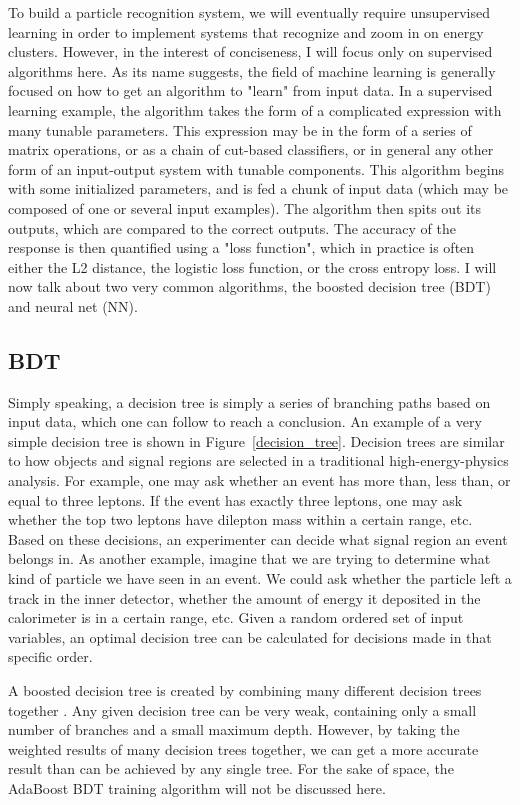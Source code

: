 To build a particle recognition system, we will eventually require unsupervised learning in order to implement systems that recognize and zoom in on energy clusters. However, in the interest of conciseness, I will focus only on supervised algorithms here. As its name suggests, the field of machine learning is generally focused on how to get an algorithm to "learn" from input data. In a supervised learning example, the algorithm takes the form of a complicated expression with many tunable parameters. This expression may be in the form of a series of matrix operations, or as a chain of cut-based classifiers, or in general any other form of an input-output system with tunable components. This algorithm begins with some initialized parameters, and is fed a chunk of input data (which may be composed of one or several input examples). The algorithm then spits out its outputs, which are compared to the correct outputs. The accuracy of the response is then quantified using a "loss function", which in practice is often either the L2 distance, the logistic loss function, or the cross entropy loss. I will now talk about two very common algorithms, the boosted decision tree (BDT) and neural net (NN).

\subsection*{BDT}

Simply speaking, a decision tree is simply a series of branching paths based on input data, which one can follow to reach a conclusion. An example of a very simple decision tree is shown in Figure~\ref{decision_tree}. Decision trees are similar to how objects and signal regions are selected in a traditional high-energy-physics analysis. For example, one may ask whether an event has more than, less than, or equal to three leptons. If the event has exactly three leptons, one may ask whether the top two leptons have dilepton mass within a certain range, etc. Based on these decisions, an experimenter can decide what signal region an event belongs in. As another example, imagine that we are trying to determine what kind of particle we have seen in an event. We could ask whether the particle left a track in the inner detector, whether the amount of energy it deposited in the calorimeter is in a certain range, etc. Given a random ordered set of input variables, an optimal decision tree can be calculated for decisions made in that specific order.

A boosted decision tree is created by combining many different decision trees together \cite{BDT}. Any given decision tree can be very weak, containing only a small number of branches and a small maximum depth. However, by taking the weighted results of many decision trees together, we can get a more accurate result than can be achieved by any single tree. For the sake of space, the AdaBoost BDT training algorithm will not be discussed here.

